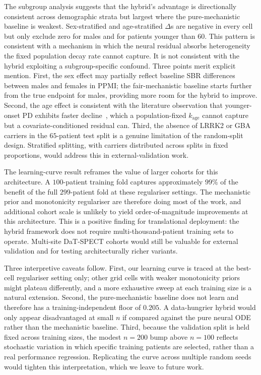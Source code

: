 The subgroup analysis suggests that the hybrid's advantage is directionally consistent across demographic strata but largest where the pure-mechanistic baseline is weakest. Sex-stratified and age-stratified $\Delta$s are negative in every cell but only exclude zero for males and for patients younger than $60$. This pattern is consistent with a mechanism in which the neural residual absorbs heterogeneity the fixed population decay rate cannot capture. It is not consistent with the hybrid exploiting a subgroup-specific confound. Three points merit explicit mention. First, the sex effect may partially reflect baseline SBR differences between males and females in PPMI; the fair-mechanistic baseline starts further from the true endpoint for males, providing more room for the hybrid to improve. Second, the age effect is consistent with the literature observation that younger-onset PD exhibits faster decline~\cite{simuni2018longitudinal}, which a population-fixed $k_{\mathrm{age}}$ cannot capture but a covariate-conditioned residual can. Third, the absence of LRRK2 or GBA carriers in the $65$-patient test split is a genuine limitation of the random-split design. Stratified splitting, with carriers distributed across splits in fixed proportions, would address this in external-validation work.

The learning-curve result reframes the value of larger cohorts for this architecture. A $100$-patient training fold captures approximately $99\%$ of the benefit of the full $299$-patient fold at these regulariser settings. The mechanistic prior and monotonicity regulariser are therefore doing most of the work, and additional cohort scale is unlikely to yield order-of-magnitude improvements at this architecture. This is a positive finding for translational deployment: the hybrid framework does not require multi-thousand-patient training sets to operate. Multi-site DaT-SPECT cohorts would still be valuable for external validation and for testing architecturally richer variants.

Three interpretive caveats follow. First, our learning curve is traced at the best-cell regulariser setting only; other grid cells with weaker monotonicity priors might plateau differently, and a more exhaustive sweep at each training size is a natural extension. Second, the pure-mechanistic baseline does not learn and therefore has a training-independent floor of $0.205$. A data-hungrier hybrid would only appear disadvantaged at small $n$ if compared against the pure neural ODE rather than the mechanistic baseline. Third, because the validation split is held fixed across training sizes, the modest $n = 200$ bump above $n = 100$ reflects stochastic variation in which specific training patients are selected, rather than a real performance regression. Replicating the curve across multiple random seeds would tighten this interpretation, which we leave to future work.

